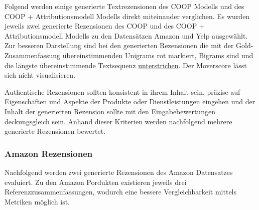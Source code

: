 \normalsize


Folgend werden einige generierte Textrezensionen des COOP Modells und des COOP + Attributionsmodell Modells direkt miteinander verglichen.
Es wurden jeweils zwei generierte Rezensionen des COOP und des COOP + Attributionsmodell Modells zu den Datensätzen Amazon und Yelp ausgewählt. 
Zur besseren Darstellung sind bei den generierten Rezensionen die mit der Gold-Zusammenfassung übereinstimmenden Unigrams \textcolor{HighlightColor}{rot} markiert, Bigrams sind  und die längste übereinstimmende Textsequenz \underline{unterstrichen}.
Der Moverscore lässt sich nicht visualisieren.

Authentische Rezensionen sollten konsistent in ihrem Inhalt sein, präzise auf Eigenschaften und Aspekte der Produkte oder Dienstleistungen eingehen und der Inhalt der generierten Rezension sollte mit den Eingabebewertungen deckungsgleich sein.
Anhand dieser Kriterien werden nachfolgend mehrere generierte Rezensionen bewertet.


\setlength{\fboxsep}{0.7em}

\subsubsection{Amazon Rezensionen}

Nachfolgend werden zwei generierte Rezensionen des Amazon Datensatzes evaluiert. Zu den Amazon Pordukten existieren jeweils drei Referenzzusammenfassungen, wodurch eine bessere Vergleichbarkeit mittels Metriken möglich ist.

